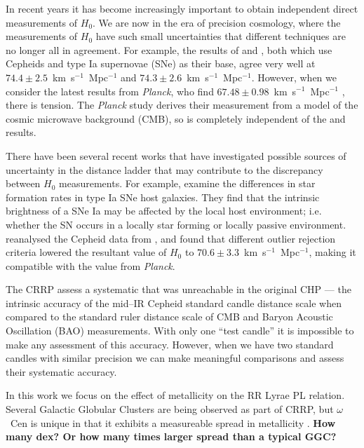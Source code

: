 \documentclass[a4paper,fleqn,usenatbib]{mnras}
\newcommand{\ho}{$H_{0}$\xspace}
\begin{document}
In recent years it has become increasingly important to obtain independent direct measurements of \ho. We are now in the era of precision cosmology, where the measurements of \ho have such small uncertainties that different techniques are no longer all in agreement. For example, the results of \citet{2011ApJ...730..119R} and \citet{2012ApJ...758...24F}, both which use Cepheids and type Ia supernovae (SNe) as their base, agree very well at $74.4\pm 2.5$~km~s$^{-1}$~Mpc$^{-1}$ and $74.3\pm2.6$~km~s$^{-1}$~Mpc$^{-1}$. However, when we consider the latest results from {\it Planck}, who find $67.48\pm0.98$~km~s$^{-1}$~Mpc$^{-1}$ \citep{2015arXiv150201589P}, there is tension. The {\it Planck} study derives their measurement from a model of the cosmic microwave background (CMB), so is completely independent of the \citeauthor{2011ApJ...730..119R} and \citeauthor{2012ApJ...758...24F} results. 

There have been several recent works that have investigated possible sources of uncertainty in the distance ladder that may contribute to the discrepancy between \ho measurements. For example, \citet{2015ApJ...802...20R} examine the differences in star formation rates in type Ia SNe host galaxies. They find that the intrinsic brightness of a SNe Ia may be affected by the local host environment; i.e. whether the SN occurs in a locally star forming or locally passive environment. \citet{2014MNRAS.440.1138E} reanalysed the Cepheid data from \citet{2011ApJ...730..119R}, and found that different outlier rejection criteria lowered the resultant value of \ho to $70.6 \pm 3.3$~km~s$^{-1}$~Mpc$^{-1}$, making it compatible with the value from {\it Planck}. 

The CRRP assess a systematic that was unreachable in the original CHP --- the intrinsic accuracy of the mid--IR Cepheid standard candle distance scale when compared to the standard ruler distance scale of CMB and Baryon Acoustic Oscillation (BAO) measurements. With only one ``test candle'' it is impossible to make any assessment of this accuracy. However, when we have two standard candles with similar precision we can make meaningful comparisons and assess their systematic accuracy.

In this work we focus on the effect of metallicity on the RR Lyrae PL relation. Several Galactic Globular Clusters are being observed as part of CRRP, but $\omega$~Cen is unique in that it exhibits a measureable spread in metallicity \citep{1975ApJ...201L..71F, 2007ApJ...663..296V, 2014ApJ...791..107V}. {\bf How many dex? Or how many times larger spread than a typical GGC?}
\end{document}

